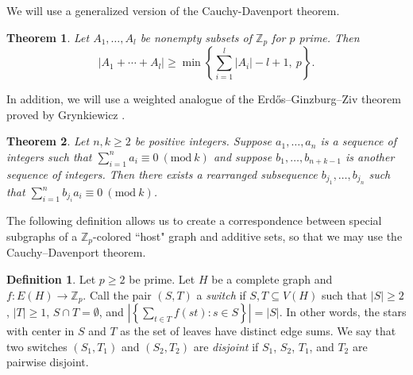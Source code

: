 \documentclass[11pt]{article}
\newcommand{\bZ}{\mathbb{Z}}
\newcommand\set[1]{\left\{ #1 \right\}}
\newcommand\abs[1]{\left\lvert #1 \right\rvert}
\newcommand\mmod[1]{\ (\mathrm{mod}\ #1)}
\theoremstyle{definition}
\newtheorem{defn}{Definition}
\theoremstyle{plain}
\newtheorem{thm}{Theorem}
\begin{document}
We will use a generalized version of the Cauchy-Davenport theorem. 
\begin{thm}
    Let $A_1,\ldots,A_l$ be nonempty subsets of $\bZ_p$ for $p$ prime. Then
    \begin{equation*}
        \abs{A_1+\cdots+A_l}\geq \min\set{\sum_{i=1}^{l}\abs{A_i}-l+1,\ p}.
    \end{equation*}
    \label{thm:CD}
\end{thm}
In addition, we will use a weighted analogue of the Erd\H{o}s--Ginzburg--Ziv theorem proved by Grynkiewicz \cite{grynkiewicz}.
\begin{thm}
    Let $n,k\geq 2$ be positive integers. Suppose $a_1,\ldots,a_n$ is a sequence of integers such that $\sum_{i=1}^{n}a_i\equiv 0\mmod{k}$ and suppose $b_1,\ldots,b_{n+k-1}$ is another sequence of integers. Then there exists a rearranged subsequence $b_{j_1},\ldots,b_{j_n}$ such that $\sum_{i=1}^{n}b_{j_i}a_i\equiv 0\mmod{k}$.
    \label{thm:weightedEGZ}
\end{thm}
The following definition allows us to create a correspondence between special subgraphs of a $\bZ_p$-colored ``host" graph and additive sets, so that we may use the Cauchy--Davenport theorem.
\begin{defn}
    Let $p\geq 2$ be prime. Let $H$ be a complete graph and $f:E(H)\to \bZ_p$. Call the pair $(S,T)$ a \textit{switch} if $S,T\subseteq V(H)$ such that $\abs{S}\geq 2$, $\abs{T}\geq 1$, $S\cap T=\emptyset$, and $\abs{\set{\sum_{t\in T}f(st):s\in S}}=\abs{S}$. In other words, the stars with center in $S$ and $T$ as the set of leaves have distinct edge sums. We say that two switches $(S_1,T_1)$ and $(S_2,T_2)$ are \textit{disjoint} if $S_1$, $S_2$, $T_1$, and $T_2$ are pairwise disjoint.
    \label{defn:switch}
\end{defn}
\end{document}
